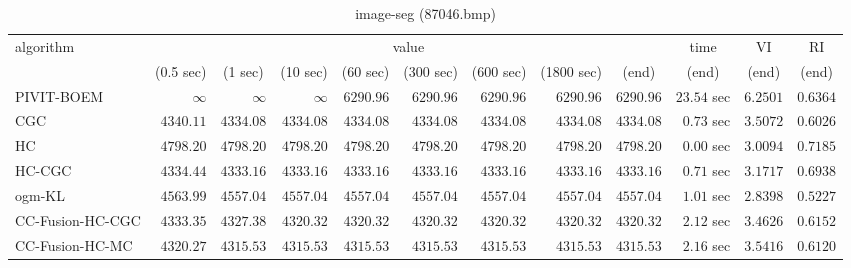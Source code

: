 \begin{table}[H]
\scriptsize
\centering
\caption{image-seg (87046.bmp)}
\label{tab:anytimetable-image-seg-87046.bmp}
\begin{tabular}{lrrrrrrrrrrr}
\toprule
           algorithm &                                   \multicolumn{8}{c}{value} & \multicolumn{1}{c}{time}    & \multicolumn{1}{c}{VI}  & \multicolumn{1}{c}{RI} \\  
\cmidrule(lr){2-9}\cmidrule(lr){10-10} \cmidrule(lr){11-11} \cmidrule(lr){12-12}   
                     & \multicolumn{1}{c}{(0.5 sec)} & \multicolumn{1}{c}{(1 sec)} & \multicolumn{1}{c}{(10 sec)} & \multicolumn{1}{c}{(60 sec)} & \multicolumn{1}{c}{(300 sec)} & \multicolumn{1}{c}{(600 sec)} & \multicolumn{1}{c}{(1800 sec)} & \multicolumn{1}{c}{(end)} & \multicolumn{1}{c}{(end)}    & \multicolumn{1}{c}{(end)}   & \multicolumn{1}{c}{(end)}  \\ \midrule 
          PIVIT-BOEM & $\infty$ & $\infty$ & $\infty$ & $      6290.96$ & $      6290.96$ & $      6290.96$ & $      6290.96$ & $      6290.96$ & $        23.54$ sec    & $       6.2501$  & $       0.6364$ \\ 
                 CGC & $      4340.11$ & $      4334.08$ & $      4334.08$ & $      4334.08$ & $      4334.08$ & $      4334.08$ & $      4334.08$ & $      4334.08$ & $         0.73$ sec    & $       3.5072$  & $       0.6026$ \\ 
                  HC & $      4798.20$ & $      4798.20$ & $      4798.20$ & $      4798.20$ & $      4798.20$ & $      4798.20$ & $      4798.20$ & $      4798.20$ & $         0.00$ sec    & $       3.0094$  & $       0.7185$ \\ 
              HC-CGC & $      4334.44$ & $      4333.16$ & $      4333.16$ & $      4333.16$ & $      4333.16$ & $      4333.16$ & $      4333.16$ & $      4333.16$ & $         0.71$ sec    & $       3.1717$  & $       0.6938$ \\ 
              ogm-KL & $      4563.99$ & $      4557.04$ & $      4557.04$ & $      4557.04$ & $      4557.04$ & $      4557.04$ & $      4557.04$ & $      4557.04$ & $         1.01$ sec    & $       2.8398$  & $       0.5227$ \\ 
    CC-Fusion-HC-CGC & $      4333.35$ & $      4327.38$ & $      4320.32$ & $      4320.32$ & $      4320.32$ & $      4320.32$ & $      4320.32$ & $      4320.32$ & $         2.12$ sec    & $       3.4626$  & $       0.6152$ \\ 
     CC-Fusion-HC-MC & $      4320.27$ & $      4315.53$ & $      4315.53$ & $      4315.53$ & $      4315.53$ & $      4315.53$ & $      4315.53$ & $      4315.53$ & $         2.16$ sec    & $       3.5416$  & $       0.6120$ \\ 

\end{tabular}
\end{table}
